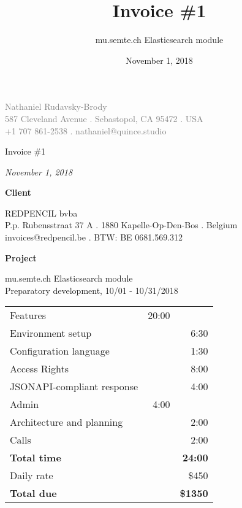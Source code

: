 \documentclass[11pt]{article}
\author{mu.semte.ch Elasticsearch module}
\date{November 1, 2018}
\title{Invoice \#1}
\begin{document}
 \thispagestyle{empty}
\centering

{\small\textcolor{gray}{
Nathaniel Rudavsky-Brody \\
587 Cleveland Avenue . Sebastopol, CA 95472 . USA\\
+1 707 861-2538  . nathaniel@quince.studio\\
}}

\vspace{4em}

{\Huge Invoice \#1}

\vspace{1em}

{\textit{November 1, 2018}}

\vspace{1em}

{\Large\textbf{Client}}

REDPENCIL bvba\\
P.p. Rubensstraat 37 A . 1880 Kapelle-Op-Den-Bos . Belgium\\
invoices@redpencil.be . BTW: BE 0681.569.312

\vspace{1em}

{\Large\textbf{Project}}

 mu.semte.ch Elasticsearch module\\
 Preparatory development, 10/01 - 10/31/2018

\vspace{1em}



\begin{table}[htb]
\centering
\begin{tabular}{lrr}

\hline
Features & 20:00 & \\
\hspace*{1em} Environment setup &  & 6:30\\
\hspace*{1em} Configuration language &  & 1:30\\
\hspace*{1em} Access Rights &  & 8:00\\
\hspace*{1em} JSONAPI-compliant response &  & 4:00\\
Admin & 4:00 & \\
\hspace*{1em} Architecture and planning &  & 2:00\\
\hspace*{1em} Calls &  & 2:00\\
\hline
\textbf{Total time} & & \textbf{24:00} \\

Daily rate & & \$450 \\

\textbf{Total due} & & \textbf{\$1350} \\
\end{tabular}
\end{table}
\end{document}
